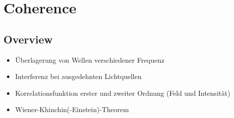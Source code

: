 \renewcommand{\lastmod}{September 18, 2023}
\renewcommand{\chapterauthors}{Markus Lippitz}

\chapter{Coherence}

\section{Overview}



\begin{itemize}
\item Überlagerung von Wellen verschiedener Frequenz  
\item Interferenz bei ausgedehnten Lichtquellen 
\item Korrelationsfunktion erster und zweiter Ordnung (Feld und Intensität)
\item Wiener-Khinchin(-Einstein)-Theorem 
\end{itemize}




\printbibliography[segment=\therefsegment,heading=subbibliography]
